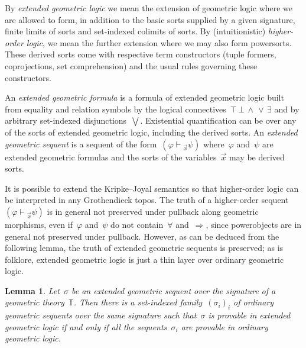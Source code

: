 \documentclass[oneside,reqno]{amsart}
\theoremstyle{definition}
\theoremstyle{plain}
\newtheorem{lemma}[defn]{Lemma}
\theoremstyle{remark}
\newcommand{\TT}{\mathbb{T}}
\renewcommand{\_}{\mathpunct{.}\,}
\newcommand{\?}{\,{:}\,}
\newcommand{\seq}[1]{\mathrel{\vdash\!\!\!_{#1}}}
\begin{document}
By \emph{extended geometric logic} we mean the extension of geometric logic
where we are allowed to form, in addition to the basic sorts supplied by
a given signature, finite limits of sorts and set-indexed colimits of sorts. By
(intuitionistic) \emph{higher-order logic}, we mean the further extension where
we may also form powersorts. These derived sorts come with respective term
constructors (tuple formers, coprojections, set comprehension) and the usual
rules governing these constructors.

An \emph{extended geometric formula} is a formula of extended geometric logic built from equality and
relation symbols by the logical
connectives~${\top}\,{\bot}\,{\wedge}\,{\vee}\,{\exists}$
and by arbitrary set-indexed disjunctions~$\bigvee$. Existential
quantification can be over any of the sorts of extended geometric logic, including the derived sorts. An
\emph{extended geometric sequent} is a sequent of the form~$(\varphi
\seq{\vec x} \psi)$ where~$\varphi$ and~$\psi$ are extended geometric
formulas and the sorts of the variables~$\vec x$ may be derived sorts.

It is possible to extend the Kripke--Joyal semantics so that higher-order logic
can be interpreted in any Grothendieck topos. The truth of a higher-order
sequent~$(\varphi \seq{\vec x} \psi)$ is in general not preserved under
pullback along geometric morphisms, even if~$\varphi$ and~$\psi$ do not
contain~${\forall}$ and~$\Rightarrow$, since powerobjects are in general not
preserved under pullback. However, as can be deduced from the following lemma,
the truth of extended geometric sequents is preserved; as is folklore, extended
geometric logic is just a thin layer over ordinary geometric logic.

\begin{lemma}\label{lemma:extended-conservative}
Let~$\sigma$ be an extended geometric sequent over the signature
of a geometric theory~$\TT$. Then there is a set-indexed family~$(\sigma_i)_i$ of ordinary
geometric sequents over the same signature such that~$\sigma$ is provable in
extended geometric logic if and only if all the sequents~$\sigma_i$ are
provable in ordinary geometric logic.\end{lemma}
\end{document}
